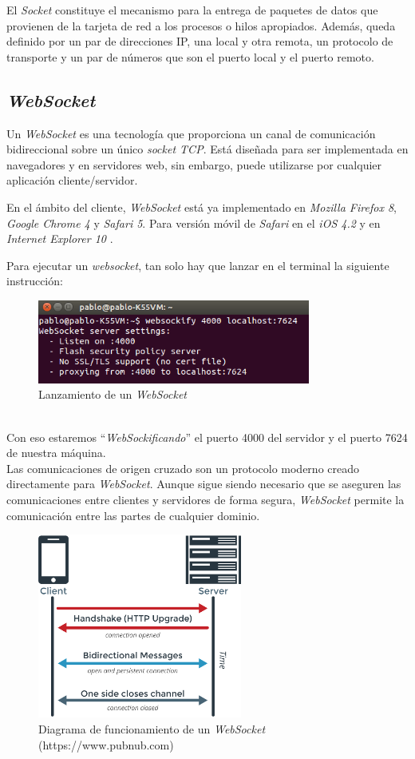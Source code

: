 El \textit{Socket} constituye el mecanismo para la entrega de paquetes de datos que provienen de la tarjeta de red a los procesos o hilos apropiados. Además, queda definido por un par de direcciones IP, una local y otra remota, un protocolo de transporte y un par de números que son el puerto local y el puerto remoto.

\subsection{\textit{WebSocket}}
Un \textit{WebSocket} es una tecnología que proporciona un canal de comunicación bidireccional sobre un único \textit{socket TCP}. Está diseñada para ser implementada en navegadores y en servidores web, sin embargo, puede utilizarse por cualquier aplicación cliente/servidor.

En el ámbito del cliente, \textit{WebSocket} está ya implementado en \textit{Mozilla Firefox 8}, \textit{Google Chrome 4} y \textit{Safari 5}. Para versión móvil de \textit{Safari} en el \textit{iOS 4.2} y en \textit{Internet Explorer 10} \cite{WebSocket}.

Para ejecutar un \textit{websocket}, tan solo hay que lanzar en el terminal la siguiente instrucción:
\begin{figure}[htb]
\centering
\includegraphics[width=0.8\textwidth]{./imagenes/WebSocket}
\caption{Lanzamiento de un \textit{WebSocket}} \label{fig:WebSocket}
\end{figure}\\

Con eso estaremos “\textit{WebSockificando}” el puerto 4000 del servidor y el puerto 7624 de nuestra máquina.\\

Las comunicaciones de origen cruzado son un protocolo moderno creado directamente para \textit{WebSocket}. Aunque sigue siendo necesario que se aseguren las comunicaciones entre clientes y servidores de forma segura, \textit{WebSocket} permite la comunicación entre las partes de cualquier dominio.\\

\begin{figure}[htb]
\centering
\includegraphics[width=0.6\textwidth]{./imagenes/WebSocketsDiagrama}
\caption{Diagrama de funcionamiento de un \textit{WebSocket} (https://www.pubnub.com)} \label{fig:WebSocketsDiagrama}
\end{figure}
